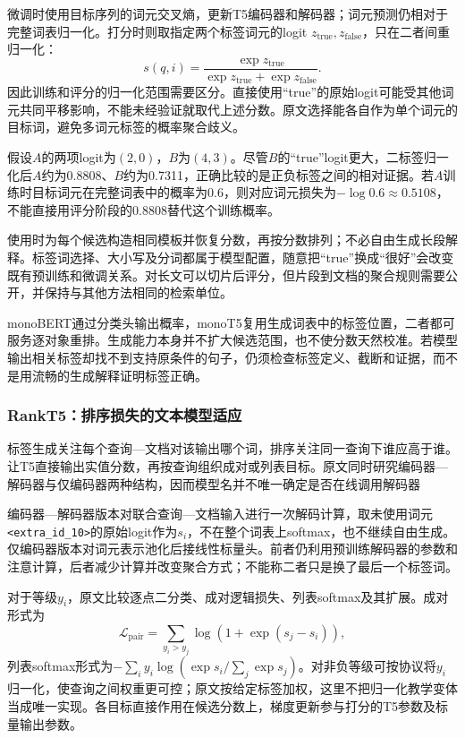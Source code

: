 微调时使用目标序列的词元交叉熵，更新T5编码器和解码器；词元预测仍相对于完整词表归一化。打分时则取指定两个标签词元的logit $z_{\mathrm{true}},z_{\mathrm{false}}$，只在二者间重归一化：
\begin{equation}
 s(q,i)=\frac{\exp z_{\mathrm{true}}}
 {\exp z_{\mathrm{true}}+\exp z_{\mathrm{false}}}.
 \label{eq:rs-search-monot5}
\end{equation}
因此训练和评分的归一化范围需要区分。直接使用“true”的原始logit可能受其他词元共同平移影响，不能未经验证就取代上述分数。原文选择能各自作为单个词元的目标词，避免多词元标签的概率聚合歧义。

假设$A$的两项logit为$(2,0)$，$B$为$(4,3)$。尽管$B$的“true”logit更大，二标签归一化后$A$约为0.8808、$B$约为0.7311，正确比较的是正负标签之间的相对证据。若$A$训练时目标词元在完整词表中的概率为0.6，则对应词元损失为$-\log0.6\approx0.5108$，不能直接用评分阶段的0.8808替代这个训练概率。

使用时为每个候选构造相同模板并恢复分数，再按分数排列；不必自由生成长段解释。标签词选择、大小写及分词都属于模型配置，随意把“true”换成“很好”会改变既有预训练和微调关系。对长文可以切片后评分，但片段到文档的聚合规则需要公开，并保持与其他方法相同的检索单位。

monoBERT通过分类头输出概率，monoT5复用生成词表中的标签位置，二者都可服务逐对象重排。生成能力本身并不扩大候选范围，也不使分数天然校准。若模型输出相关标签却找不到支持原条件的句子，仍须检查标签定义、截断和证据，而不是用流畅的生成解释证明标签正确。

\Needspace{100mm}
\subsubsection{RankT5：排序损失的文本模型适应}
\label{sec:rs-search-rankt5}

标签生成关注每个查询—文档对该输出哪个词，排序关注同一查询下谁应高于谁。让T5直接输出实值分数，再按查询组织成对或列表目标。原文同时研究编码器—解码器与仅编码器两种结构，因而模型名并不唯一确定是否在线调用解码器

编码器—解码器版本对联合查询—文档输入进行一次解码计算，取未使用词元\texttt{<extra\_id\_10>}的原始logit作为$s_i$，不在整个词表上softmax，也不继续自由生成。仅编码器版本对词元表示池化后接线性标量头。前者仍利用预训练解码器的参数和注意计算，后者减少计算并改变聚合方式；不能称二者只是换了最后一个标签词。

对于等级$y_i$，原文比较逐点二分类、成对逻辑损失、列表softmax及其扩展。成对形式为
\begin{equation}
 \mathcal L_{\mathrm{pair}}=
 \sum_{y_i>y_j}\log(1+\exp(s_j-s_i)),
 \label{eq:rs-search-rankt5}
\end{equation}
列表softmax形式为$-\sum_i y_i\log(\exp s_i/\sum_j\exp s_j)$。对非负等级可按协议将$y_i$归一化，使查询之间权重更可控；原文按给定标签加权，这里不把归一化教学变体当成唯一实现。各目标直接作用在候选分数上，梯度更新参与打分的T5参数及标量输出参数。

